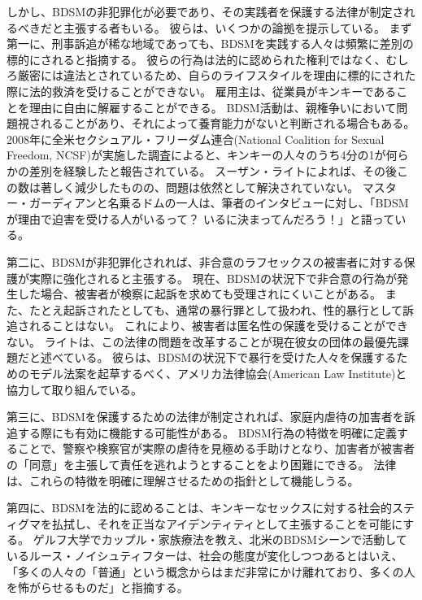 \documentclass[paper=a4,book,openany]{jlreq} \usepackage{mystyle}
\begin{document}
しかし、BDSMの非犯罪化が必要であり、その実践者を保護する法律が制定されるべきだと主張する者もいる。
彼らは、いくつかの論拠を提示している。
まず第一に、刑事訴追が稀な地域であっても、BDSMを実践する人々は頻繁に差別の標的にされると指摘する。
彼らの行為は法的に認められた権利ではなく、むしろ厳密には違法とされているため、自らのライフスタイルを理由に標的にされた際に法的救済を受けることができない。
雇用主は、従業員がキンキーであることを理由に自由に解雇することができる\citep{keenan14:_can_you_reall}。
BDSM活動は、親権争いにおいて問題視されることがあり、それによって養育能力がないと判断される場合もある\citep{zavadski15:_paren_can_lose}。
2008年に全米セクシュアル・フリーダム連合(National Coalition for Sexual Freedom, NCSF)が実施した調査によると、キンキーの人々のうち4分の1が何らかの差別を経験したと報告されている\citep{sexual08:_secon_nation_survey_violen_discr}。
スーザン・ライトによれば、その後この数は著しく減少したものの、問題は依然として解決されていない。
マスター・ガーディアンと名乗るドムの一人は、筆者のインタビューに対し、「BDSMが理由で迫害を受ける人がいるって？ いるに決まってんだろう！」と語っている。

第二に、BDSMが非犯罪化されれば、非合意のラフセックスの被害者に対する保護が実際に強化されると主張する。
現在、BDSMの状況下で非合意の行為が発生した場合、被害者が検察に起訴を求めても受理されにくいことがある。
また、たとえ起訴されたとしても、通常の暴行罪として扱われ、性的暴行として訴追されることはない。
これにより、被害者は匿名性の保護を受けることができない。
ライトは、この法律の問題を改革することが現在彼女の団体の最優先課題だと述べている。
彼らは、BDSMの状況下で暴行を受けた人々を保護するためのモデル法案を起草するべく、アメリカ法律協会(American Law Institute)と協力して取り組んでいる\citep{mcarthur16:_its_traves_that_bdsm_isnt_techn_legal}。

第三に、BDSMを保護するための法律が制定されれば、家庭内虐待の加害者を訴追する際にも有効に機能する可能性がある。
BDSM行為の特徴を明確に定義することで、警察や検察官が実際の虐待を見極める手助けとなり、加害者が被害者の「同意」を主張して責任を逃れようとすることをより困難にできる。
法律は、これらの特徴を明確に理解させるための指針として機能しうる。

第四に、BDSMを法的に認めることは、キンキーなセックスに対する社会的スティグマを払拭し、それを正当なアイデンティティとして主張することを可能にする。
ゲルフ大学でカップル・家族療法を教え、北米のBDSMシーンで活動しているルース・ノイシュティフターは、社会の態度が変化しつつあるとはいえ、「多くの人々の「普通」という概念からはまだ非常にかけ離れており、多くの人を怖がらせるものだ」と指摘する\citep{mcarthur16:_its_traves_that_bdsm_isnt_techn_legal}。
\end{document}
